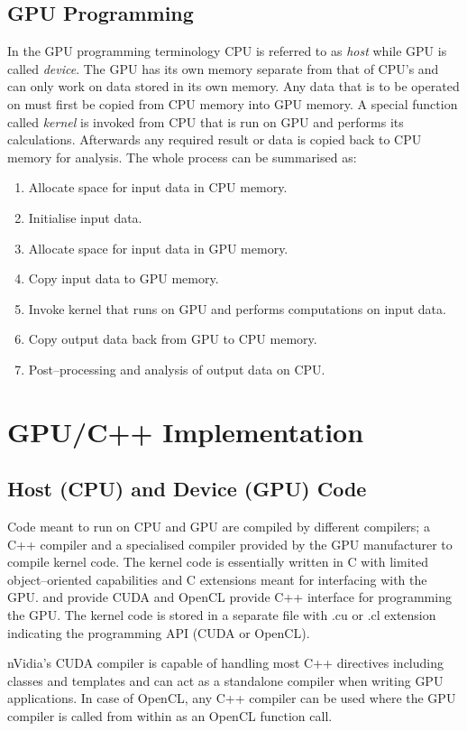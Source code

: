 \subsection{GPU Programming}
In the GPU programming terminology CPU is referred to as \emph{host} while GPU is called \emph{device}. The GPU has its own memory separate from that of CPU's and can only work on data stored in its own memory. Any data that is to be operated on must first be copied from CPU memory into GPU memory. A special function called \emph{kernel} is invoked from CPU that is run on GPU and performs its calculations. Afterwards any required result or data is copied back to CPU memory for analysis. The whole process can be summarised as:
\begin{enumerate}
	\item Allocate space for input data in CPU memory.
	\item Initialise input data.
	\item Allocate space for input data in GPU memory.
	\item Copy input data to GPU memory.
	\item Invoke kernel that runs on GPU and performs computations on input data.
	\item Copy output data back from GPU to CPU memory.
	\item Post--processing and analysis of output data on CPU.
\end{enumerate}
\section{GPU/C++ Implementation}
\subsection{Host (CPU) and Device (GPU) Code}
Code meant to run on CPU and GPU are compiled by different compilers; a C++ compiler and a specialised compiler provided by the GPU manufacturer to compile kernel code. The kernel code is essentially written in C with limited object--oriented capabilities and C extensions meant for interfacing with the GPU. and provide CUDA and OpenCL provide C++ interface for programming the GPU. The kernel code is stored in a separate file with .cu or .cl extension indicating the programming API (CUDA or OpenCL).

nVidia's CUDA compiler is capable of handling most C++ directives including classes and templates and can act as a standalone compiler when writing GPU applications. In case of OpenCL, any C++ compiler can be used where the GPU compiler is called from within as an OpenCL function call.
